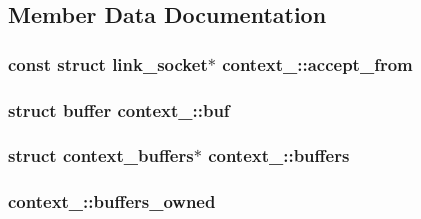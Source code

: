 \subsection{Member Data Documentation}
\hypertarget{structcontext__2_a4cb8c7cbd964e80ede783143a456d44d}{}
\subsubsection[{accept\+\_\+from}]{\setlength{\rightskip}{0pt plus 5cm}const struct {\bf link\+\_\+socket}$\ast$ context\+\_\+::accept\+\_\+from}\label{structcontext__2_a4cb8c7cbd964e80ede783143a456d44d}
\hypertarget{structcontext__2_acb9836ce1e5f8cdc0b88ce89380fb7b0}{}
\subsubsection[{buf}]{\setlength{\rightskip}{0pt plus 5cm}struct {\bf buffer} context\+\_\+::buf}\label{structcontext__2_acb9836ce1e5f8cdc0b88ce89380fb7b0}
\hypertarget{structcontext__2_ae2e304ff3393a09ee15f7490f50b89d8}{}
\subsubsection[{buffers}]{\setlength{\rightskip}{0pt plus 5cm}struct {\bf context\+\_\+buffers}$\ast$ context\+\_\+::buffers}\label{structcontext__2_ae2e304ff3393a09ee15f7490f50b89d8}
\hypertarget{structcontext__2_aa0413cae96937fb6fca54e18e5b5d3d7}{}
\subsubsection[{buffers\+\_\+owned}]{ context\+\_\+::buffers\+\_\+owned}\label{structcontext__2_aa0413cae96937fb6fca54e18e5b5d3d7}
\hypertarget{structcontext__2_a7a1136ef8707e675d479855614eadb10}{}
